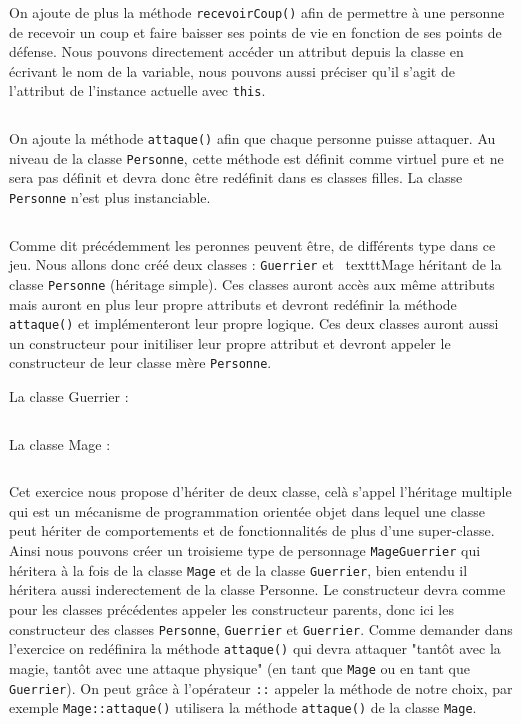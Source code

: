 On ajoute de plus la méthode \texttt{recevoirCoup()} afin de permettre à une personne de recevoir un coup et faire baisser ses points de vie en fonction de ses points de défense. Nous pouvons directement accéder un attribut depuis la classe en écrivant le nom de la variable, nous pouvons aussi préciser qu'il s'agit de l'attribut de l'instance actuelle avec \texttt{this}.

\inputminted[linenos,firstline=23,lastline=27]{cpp}{../sources/cpp/TP9-10/Personne.cpp}

On ajoute la méthode \texttt{attaque()} afin que chaque personne puisse attaquer. Au niveau de la classe \texttt{Personne}, cette méthode est définit comme virtuel pure et ne sera pas définit et devra donc être redéfinit dans es classes filles. La classe \texttt{Personne} n'est plus instanciable.

\inputminted[linenos,firstline=14,lastline=38]{cpp}{../sources/cpp/TP9-10/Personne.h}

Comme dit précédemment les peronnes peuvent être, de différents type dans ce jeu. Nous allons donc créé deux classes : \texttt{Guerrier} et \ texttt{Mage} héritant de la classe \texttt{Personne} (héritage simple).
Ces classes auront accès aux même attributs mais auront en plus leur propre attributs et devront redéfinir la méthode \texttt{attaque()} et implémenteront leur propre logique.
Ces deux classes auront aussi un constructeur pour initiliser leur propre attribut et devront appeler le constructeur de leur classe mère \texttt{Personne}.

La classe Guerrier :
\inputminted[linenos,firstline=12,lastline=23]{cpp}{../sources/cpp/TP9-10/Guerrier.h}

La classe Mage :
\inputminted[linenos,firstline=12,lastline=26]{cpp}{../sources/cpp/TP9-10/Mage.h}

Cet exercice nous propose d'hériter de deux classe, celà s'appel l'héritage multiple qui est un mécanisme de programmation orientée objet dans lequel une classe peut hériter de comportements et de fonctionnalités de plus d'une super-classe.
Ainsi nous pouvons créer un troisieme type de personnage \texttt{MageGuerrier} qui héritera à la fois de la classe \texttt{Mage} et de la classe \texttt{Guerrier}, bien entendu il héritera aussi inderectement de la classe Personne.
Le constructeur devra comme pour les classes précédentes appeler les constructeur parents, donc ici les constructeur des classes \texttt{Personne}, \texttt{Guerrier} et \texttt{Guerrier}.
Comme demander dans l'exercice on redéfinira la méthode \texttt{attaque()} qui devra attaquer "tantôt avec la magie, tantôt avec une attaque physique" (en tant que \texttt{Mage} ou en tant que \texttt{Guerrier}). On peut grâce à l'opérateur \texttt{::} appeler la méthode de notre choix, par exemple \texttt{Mage::attaque()} utilisera la méthode \texttt{attaque()} de la classe \texttt{Mage}.

